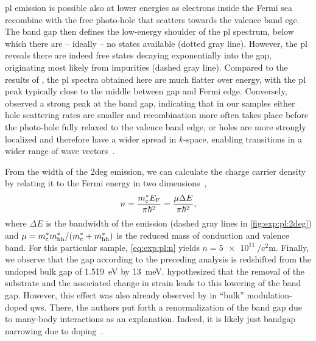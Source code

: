 \Gls{pl} emission is possible also at lower energies as electrons inside the Fermi sea recombine with the free photo-hole that scatters towards the valence band ege.
The band gap then defines the low-energy shoulder of the \gls{pl} spectrum, below which there are -- ideally -- no states available (dotted gray line).
However, the \gls{pl} reveals there are indeed free states decaying exponentially into the gap, originating most likely from impurities (dashed gray line).
Compared to the results of \citet{Kamburov2017}, the \gls{pl} spectra obtained here are much flatter over energy, with the \gls{pl} peak typically close to the middle between gap and Fermi edge.
Conversely,  observed a strong peak at the band gap, indicating that in our samples either hole scattering rates are smaller and recombination more often takes place before the photo-hole fully relaxed to the valence band edge, or holes are more strongly localized and therefore have a wider spread in $k$-space, enabling transitions in a wider range of wave vectors~\cite{Skolnick1987}.

From the width of the \gls{2deg} emission, we can calculate the charge carrier density by relating it to the Fermi energy in two dimensions~\cite{Pinczuk1984,Ihn2009},
\begin{equation}\label{eq:exp:pl:n}
    n = \frac{m^{\ast}_{\mathrm{c}}E_{\mathrm{F}}}{\pi\hbar^2} = \frac{\mu\Delta E}{\pi\hbar^2},
\end{equation}
where $\Delta E$ is the bandwidth of the emission (dashed gray lines in \cref{fig:exp:pl:2deg}) and $\mu = m^{\ast}_{\mathrm{c}}m^{\ast}_{\mathrm{hh}}/(m^{\ast}_{\mathrm{c}} + m^{\ast}_{\mathrm{hh}})$ is the reduced mass of conduction and valence band.
For this particular sample, \cref{eq:exp:pl:n} yields $n = \qty{5e11}{\per\square\centi\meter}$. %
Finally, we observe that the gap according to the preceding analysis is redshifted from the undoped bulk gap of \qty{1.519}{\electronvolt} by \qty{13}{\milli\electronvolt}. %
 hypothesized that the removal of the  substrate and the associated change in strain leads to this lowering of the band gap.
However, this effect was also already observed by \citet{Pinczuk1984} in \enquote{bulk} modulation-doped  \glspl{qw}.
There, the authors put forth a renormalization of the band gap due to many-body interactions as an explanation.
Indeed, it is likely just bandgap narrowing due to doping~\cite{Jain1992}.

